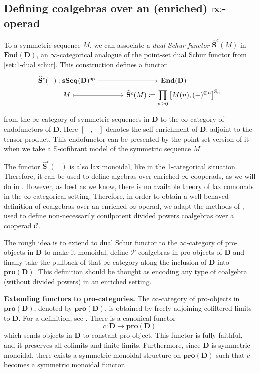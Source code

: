 \documentclass{proc-l}
\theoremstyle{plain}
\theoremstyle{definition}
\theoremstyle{remark}
\begin{document}
\subsection{Defining coalgebras over an (enriched) $\infty$-operad}%
\label{Section:3.2}To a symmetric sequence $M$, we can associate a \emph{dual Schur functor} $\widehat{\mathbf{S}}^c(M)$ in $\mathbf{End}(\mathbf{D})$,  an $\infty$-categor\-ic\-al analogue of the point-set {dual Schur functor} from \cref{set:1-dual schur}. This construction  defines a functor
\[
\begin{tikzcd}[column sep=3pc,row sep=0pc]
\widehat{\mathbf{S}}^c(-): \mathbf{sSeq}(\mathbf{D})^{\mathsf{op}} \arrow[r]
&\mathbf{End}(\mathbf{D}) \\
M \arrow[r,mapsto]
&\widehat{\mathbf{S}}^c(M) \coloneqq \displaystyle \prod_{n \geq 0} \left[M(n),(-)^{\otimes n}\right]^{\mathbb{S}_n}
\end{tikzcd}
\]
from the $\infty$-category of symmetric sequences in $\mathbf{D}$ to the $\infty$-category of endofunctors of $\mathbf{D}$. Here $[-,-]$ denotes the self-enrichment of $\mathbf{D}$, adjoint to the tensor product. This endofunctor can be presented by the point-set version of it when we take a $\mathbb{S}$-cofibrant model of the symmetric sequence $M$.

The functor $\widehat{\mathbf{S}}^c(-)$ is also lax monoidal, like in the 1-categorical situation. Therefore, it can be used to define algebras over enriched $\infty$-cooperads, as we will do in \cite{poinsetkoszul}. However, as best as we know, there is no available theory of lax comonads in the $\infty$-categorical setting. Therefore, in order to obtain a well-behaved definition of coalgebras over an enriched $\infty$-operad, we adapt the methods of \cite[Appendix A]{heuts2024}, used to define non-necessarily conilpotent divided powers coalgebras over a cooperad $\mathscr{C}$.

The rough idea is to extend to dual Schur functor to the $\infty$-category of pro-objects in $\mathbf{D}$ to make it monoidal, define $\mathscr{P}$-coalgebras in pro-objects of $\mathbf{D}$ and finally take the pullback of that $\infty$-category along the inclusion of $\mathbf{D}$ into $\mathbf{pro}(\mathbf{D})$.  This definition should be thought as encoding any type of coalgebra (without divided powers) in an enriched setting.

\textbf{Extending functors to pro-categories.} The $\infty$-category of pro-objects in $\mathbf{pro}(\mathbf{D})$, denoted by $\mathbf{pro}(\mathbf{D})$, is obtained by freely adjoining cofiltered limits to $\mathbf{D}$. For a definition, see \cite[Section 3.1]{Lurie11Rational}. There is a canonical functor
\[
c: \mathbf{D} \longrightarrow \mathbf{pro}(\mathbf{D})
\]
which sends objects in $\mathbf{D}$ to constant pro-object. This functor is fully faithful, and it preserves all colimits and finite limits. Furthermore, since $\mathbf{D}$ is symmetric monoidal, there exists a symmetric monoidal structure on $\mathbf{pro}(\mathbf{D})$ such that $c$ becomes a symmetric monoidal functor.
\end{document}
